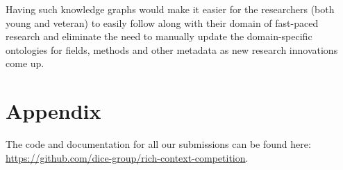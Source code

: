 \documentclass[runningheads]{llncs}
\begin{document}
Having such knowledge graphs would make it easier for the researchers (both young and veteran) to easily follow along with their domain of fast-paced research and eliminate the need to manually update the domain-specific ontologies for fields, methods and other metadata as new research innovations come up.


\section{Appendix}
The code and documentation for all our submissions can be found here:
\url{https://github.com/dice-group/rich-context-competition}.



 


\end{document}
